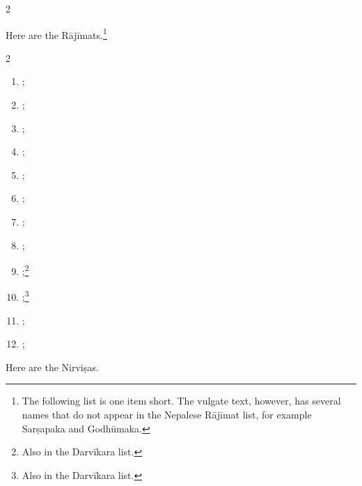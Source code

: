 \begin{translation}
\begin{multicols}{2}
\begin{enumerate}
    \end{enumerate}
\end{multicols}
        
        \medskip
        
\item[34.3]

Here are the Rājīmats.\footnote{The following list is one item short.  The 
vulgate text, however, has several names that do not appear in the Nepalese 
Rājīmat list, for example Sarṣapaka and Godhūmaka.}
\begin{multicols}{2}
    \begin{enumerate}
        \raggedright
        \item {}; 
        \item {}; 
\item {}; 
\item {}; 
\item {}; 
\item {}; 
\item {}; 
\item {}; 
\item {};\protect\footnote{Also in the 
Darvīkara 
list.}  
\item {};\protect\footnote{Also in the Darvīkara 
    list.}  
\item {}; 
\item {};
  
    \end{enumerate}
\end{multicols}

\medskip

\item[34.4]
Here are the Nirviṣas.


\end{translation}
